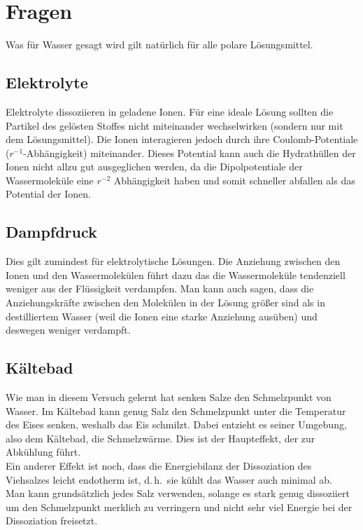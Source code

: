 \section{Fragen}
Was für Wasser gesagt wird gilt natürlich für alle polare Lösungsmittel.

\subsection{Elektrolyte}
Elektrolyte dissoziieren in geladene Ionen. Für eine ideale Lösung sollten die Partikel des gelösten Stoffes nicht miteinander wechselwirken (sondern nur mit dem Lösungsmittel). Die Ionen interagieren jedoch durch ihre Coulomb-Potentiale ($r^{-1}$-Abhängigkeit) miteinander. Dieses Potential kann auch die Hydrathüllen der Ionen nicht allzu gut ausgeglichen werden, da die Dipolpotentiale der Wassermoleküle eine $r^{-2}$ Abhängigkeit haben und somit schneller abfallen als das Potential der Ionen.

\subsection{Dampfdruck}
Dies gilt zumindest für elektrolytische Lösungen. Die Anziehung zwischen den Ionen und den Wassermolekülen führt dazu das die Wassermoleküle tendenziell weniger aus der Flüssigkeit verdampfen. Man kann auch sagen, dass die Anziehungskräfte zwischen den Molekülen in der Lösung größer sind als in destilliertem Wasser (weil die Ionen eine starke Anziehung ausüben) und deswegen weniger verdampft.

\subsection{Kältebad}
Wie man in diesem Versuch gelernt hat senken Salze den Schmelzpunkt von Wasser. Im Kältebad kann genug Salz den Schmelzpunkt unter die Temperatur des Eises senken, weshalb das Eis schmilzt. Dabei entzieht es seiner Umgebung, also dem Kältebad, die Schmelzwärme. Dies ist der Haupteffekt, der zur Abkühlung führt.\\
Ein anderer Effekt ist noch, dass die Energiebilanz der Dissoziation des Viehsalzes leicht endotherm ist, d.\,h.\ sie kühlt das Wasser auch minimal ab.\\
Man kann grundsätzlich jedes Salz verwenden, solange es stark genug dissoziiert um den Schmelzpunkt merklich zu verringern und nicht sehr viel Energie bei der Dissoziation freisetzt.

